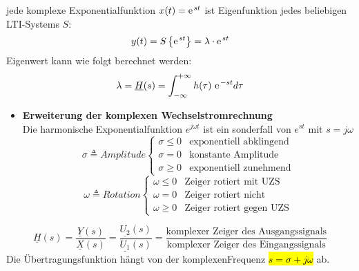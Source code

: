\begin{mdframed}[style=exercise]
  jede komplexe Exponentialfunktion $x(t) = \e^{st}$ ist Eigenfunktion
  jedes beliebigen LTI-Systems $S$:
  \[
      y(t) = S\left\{ \e^{st} \right\} = \lambda\cdot \e^{st}
  \]
  Eigenwert kann wie folgt berechnet werden:
  \[
      \lambda = \underline{H}(s) = \int_{-\infty}^{+\infty} h(\tau)\  \e^{-st} d\tau
  \]
  \begin{itemize}
      \item{\textbf{Erweiterung der komplexen Wechselstromrechnung}}\\
          Die harmonische Exponentialfunktion $e^{j\omega t}$ ist ein
          sonderfall von $e^{st}$ mit $s=j\omega$
          \[
              \sigma \triangleq Amplitude
              \begin{cases}
                  \sigma \leq 0 & \text{exponentiell abklingend}\\
                  \sigma = 0 & \text{konstante Amplitude}\\
                  \sigma \geq 0 & \text{exponentiell zunehmend}
              \end{cases}
          \]
          \[
              \omega \triangleq Rotation
              \begin{cases}
                  \omega \leq 0 & \text{Zeiger rotiert mit UZS}\\
                  \omega = 0 & \text{Zeiger rotiert nicht}\\
                  \omega \geq 0 & \text{Zeiger rotiert gegen UZS}
              \end{cases}
          \]
  \end{itemize}
\end{mdframed}

\begin{mdframed}[style=exercise,frametitle=Komplexe \"Ubertragungsfunktion]
  \footnotesize
  \[
      \underline{H}(s)=\frac{\underline{Y}(s)}{\underline{X}(s)}=\frac{\underline{U_2}(s)}{\underline{U_1}(s)}=\frac{\text{komplexer
      Zeiger des Ausgangssignals}}{\text{komplexer Zeiger des
      Eingangssignals}}
  \]
  \normalsize
  Die Übertragungsfunktion hängt von der komplexen\linebreak Frequenz
  \hl{$s=\sigma+j\omega$} ab.
\end{mdframed}

